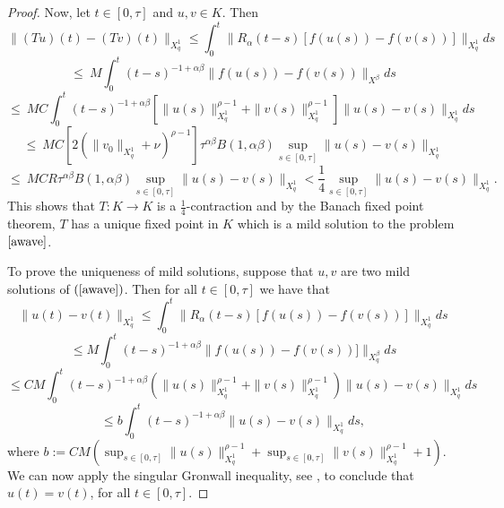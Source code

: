 \documentclass[12pt,reqno]{amsart}
\begin{document}
\begin{proof}
	Now, let $t\in [0,\tau]$ and $u, v \in K$. Then
	$$\|(Tu)(t)-(Tv)(t)\|_{X^{1}_{q}}\leq \int_{0}^{t}\|R_{\alpha}(t-s)[f(u(s))-f(v(s))]\|_{X^{1}_{q}}ds$$
	$$\leq\ M\int_{0}^{t}(t-s)^{-1+\alpha\beta}\|f(u(s))-f(v(s))\|_{X^{\beta}}ds$$
	$$\leq\ MC\int_{0}^{t}(t-s)^{-1+\alpha\beta}[\|u(s)\|_{X^{1}_{q}}^{\rho-1}+ \|v(s)\|_{X^{1}_{q}}^{\rho-1}]\|u(s)-v(s)\|_{X^{1}_{q}}ds$$
	$$\leq\ MC[2(\|v_0\|_{X^{1}_{q}} +\nu)^{\rho-1}]\tau^{\alpha\beta}B(1,\alpha\beta)\sup_{s\in [0,\tau]}\|u(s)-v(s)\|_{X^{1}_{q}}$$
	$$\leq\ MCR\tau^{\alpha\beta}B(1,\alpha\beta)\sup_{s\in [0,\tau]}\|u(s)-v(s)\|_{X^{1}_{q}}< \frac{1}{4}\sup_{s\in [0,\tau]}\|u(s)-v(s)\|_{X^{1}_{q}}.$$
	This shows that $T:K\rightarrow K$ is a $\frac{1}{4}$-contraction and by the Banach fixed point theorem, $T$ has a unique fixed point in $K$ which is a mild solution to the problem $\eqref{awave}$. 
	
	To prove the uniqueness of mild solutions, suppose that $ u, v $ are two mild solutions of $(\ref{awave})$. Then for all $t\in [0,\tau]$ we have that
	$$\|u(t)-v(t)\|_{X^{1}_{q}}%
	\leq\int_{0}^{t}\|R_{\alpha}(t-s)[f(u(s))-f(v(s))]\|_{X^{1}_{q}}ds$$
	$$\leq M \int_{0}^{t}(t-s)^{-1+\alpha\beta}\|f(u(s))-f(v(s))]\|_{X^{\beta}_{q}}ds$$
	$$\leq CM\int_{0}^{t}(t-s)^{-1+\alpha\beta}(\|u(s)\|_{X^{1}_{q}}^{\rho-1}+ \|v(s)\|_{X^{1}_{q}}^{\rho-1})\|u(s)-v(s)\|_{X^{1}_{q}}ds$$
	$$\leq b\int_{0}^{t}(t-s)^{-1+\alpha\beta}\|u(s)-v(s)\|_{X^{1}_{q}}ds,$$
	where $b:= CM(\sup_{s\in[0,\tau]}\|u(s)\|_{X^{1}_{q}}^{\rho-1}+ \sup_{s\in[0,\tau]}\|v(s)\|_{X^{1}_{q}}^{\rho-1}+1)$.
	We can now apply the singular Gronwall inequality, see \cite[Lemma 7.1.1, page 188]{Henry}, to conclude that $u(t)=v(t)$, for all $t\in[0,\tau]$. 
	

\end{proof}
\end{document}
